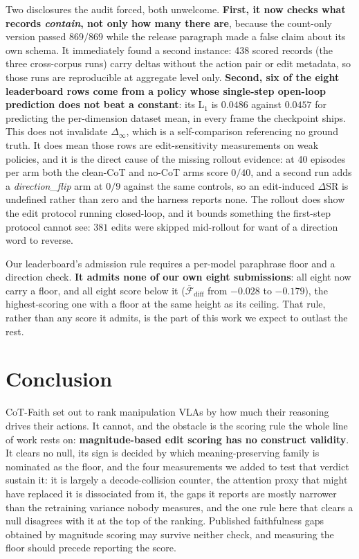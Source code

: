 \documentclass[11pt]{article}
\begin{document}
Two disclosures the audit forced, both unwelcome. \textbf{First, it now checks what records \emph{contain}, not only how many there are}, because the count-only version passed $869/869$ while the release paragraph made a false claim about its own schema. It immediately found a second instance: 438 scored records (the three cross-corpus runs) carry deltas without the action pair or edit metadata, so those runs are reproducible at aggregate level only. \textbf{Second, six of the eight leaderboard rows come from a policy whose single-step open-loop prediction does not beat a constant}: its L$_1$ is $0.0486$ against $0.0457$ for predicting the per-dimension dataset mean, in every frame the checkpoint ships. This does not invalidate $\Delta_\infty$, which is a self-comparison referencing no ground truth. It does mean those rows are edit-sensitivity measurements on weak policies, and it is the direct cause of the missing rollout evidence: at 40 episodes per arm both the clean-CoT and no-CoT arms score $0/40$, and a second run adds a \emph{direction\_flip} arm at $0/9$ against the same controls, so an edit-induced $\Delta$SR is undefined rather than zero and the harness reports none. The rollout does show the edit protocol running closed-loop, and it bounds something the first-step protocol cannot see: $381$ edits were skipped mid-rollout for want of a direction word to reverse.

Our leaderboard's admission rule requires a per-model paraphrase floor and a direction check. \textbf{It admits none of our own eight submissions}: all eight now carry a floor, and all eight score below it ($\bar{\mathcal{F}}_{\text{diff}}$ from $-0.028$ to $-0.179$), the highest-scoring one with a floor at the same height as its ceiling. That rule, rather than any score it admits, is the part of this work we expect to outlast the rest.


\section{Conclusion}

CoT-Faith set out to rank manipulation VLAs by how much their reasoning drives their actions. It cannot, and the obstacle is the scoring rule the whole line of work rests on: \textbf{magnitude-based edit scoring has no construct validity}. It clears no null, its sign is decided by which meaning-preserving family is nominated as the floor, and the four measurements we added to test that verdict sustain it: it is largely a decode-collision counter, the attention proxy that might have replaced it is dissociated from it, the gaps it reports are mostly narrower than the retraining variance nobody measures, and the one rule here that clears a null disagrees with it at the top of the ranking. Published faithfulness gaps obtained by magnitude scoring may survive neither check, and measuring the floor should precede reporting the score.
\end{document}
